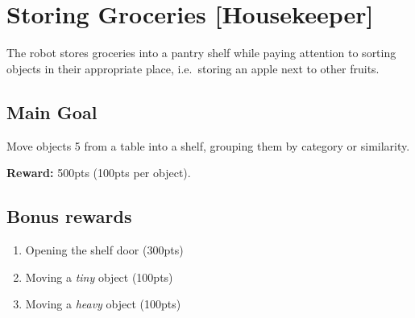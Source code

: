 \section{Storing Groceries [Housekeeper]}
\label{test:storing-groceries}
The robot stores groceries into a pantry shelf while paying attention to sorting objects in their appropriate place, i.e.~storing an apple next to other fruits.


\subsection*{Main Goal}
Move objects 5 from a table into a shelf, grouping them by category or similarity.

\noindent\textbf{Reward:} 500pts (100pts per object).\\

\subsection*{Bonus rewards}
\begin{enumerate}[nosep]
	\item Opening the shelf door (300pts)
	\item Moving a \emph{tiny} object (100pts)
	\item Moving a \emph{heavy} object (100pts)
\end{enumerate}

%
%

